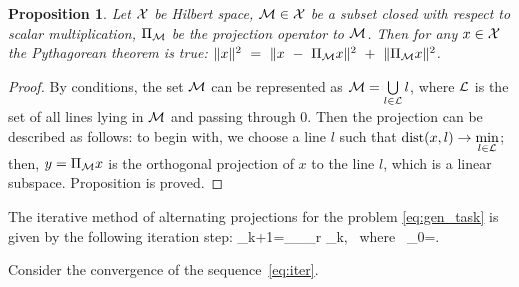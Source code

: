 \documentclass[sii]{ipart}
\newtheorem{proposition}{Proposition}
\begin{document}
\begin{proposition} \label{pythaprop}
	Let $\mathcal{X}$ be Hilbert space, $\mathcal{M}\in \mathcal{X}$ be a subset closed with respect to scalar multiplication, $\Pi_{\mathcal{M}}$ be the projection operator to $\mathcal{M}$. Then for any $x \in \mathcal{X}$ the Pythagorean theorem is true: $\|x\|^2~=~\|x~-~\Pi_{\mathcal{M}} x\|^2~+~\|\Pi_{\mathcal{M}} x\|^2$.
\end{proposition}
\begin{proof}
	By conditions, the set $\mathcal{M}$ can be represented as $\mathcal{M} = \bigcup\limits_{l \in \mathcal{L}}l$, where $\mathcal{L}$ is the set of all lines lying in $\mathcal{M}$ and passing through $0$. Then the projection can be described as follows: to begin with, we choose a line $l$ such that $\mathop{\mathrm{dist}}(x, l) \rightarrow \min\limits_{l \in \mathcal{L}}$; then, $y = \Pi_{\mathcal{M}} x$ is the orthogonal projection of $x$ to the line $l$, which is a linear subspace. Proposition is proved.
\end{proof}

The iterative method of alternating projections for the problem \eqref{eq:gen_task} is given by the following iteration step:
\be
\label{eq:iter}
\bfY_{k+1}=\Pi_\calH \Pi_{\calM_r} \bfY_{k}, \mbox{\ where\ } \bfY_{0}=\bfX.
\ee

Consider the convergence of the sequence~\eqref{eq:iter}.
\end{document}
